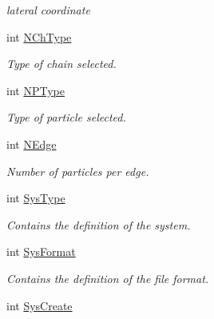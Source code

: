 \begin{DoxyCompactItemize}
\begin{DoxyCompactList}\small\item\em lateral coordinate \end{DoxyCompactList}\item 
\hypertarget{classVarData_ab414e7210af332040754fc1daaa67509}{int \hyperlink{classVarData_ab414e7210af332040754fc1daaa67509}{\-N\-Ch\-Type}}\label{classVarData_ab414e7210af332040754fc1daaa67509}

\begin{DoxyCompactList}\small\item\em \-Type of chain selected. \end{DoxyCompactList}\item 
\hypertarget{classVarData_a4a5c47b800a1299ec5e54e369467dfeb}{int \hyperlink{classVarData_a4a5c47b800a1299ec5e54e369467dfeb}{\-N\-P\-Type}}\label{classVarData_a4a5c47b800a1299ec5e54e369467dfeb}

\begin{DoxyCompactList}\small\item\em \-Type of particle selected. \end{DoxyCompactList}\item 
\hypertarget{classVarData_ae2e67b49132b33a026b19c647cbf4f3c}{int \hyperlink{classVarData_ae2e67b49132b33a026b19c647cbf4f3c}{\-N\-Edge}}\label{classVarData_ae2e67b49132b33a026b19c647cbf4f3c}

\begin{DoxyCompactList}\small\item\em \-Number of particles per edge. \end{DoxyCompactList}\item 
\hypertarget{classVarData_ad396ed53d4010dad8257a97973324c40}{int \hyperlink{classVarData_ad396ed53d4010dad8257a97973324c40}{\-Sys\-Type}}\label{classVarData_ad396ed53d4010dad8257a97973324c40}

\begin{DoxyCompactList}\small\item\em \-Contains the definition of the system. \end{DoxyCompactList}\item 
\hypertarget{classVarData_acefa5842862d4587442db05af40e7490}{int \hyperlink{classVarData_acefa5842862d4587442db05af40e7490}{\-Sys\-Format}}\label{classVarData_acefa5842862d4587442db05af40e7490}

\begin{DoxyCompactList}\small\item\em \-Contains the definition of the file format. \end{DoxyCompactList}\item 
\hypertarget{classVarData_a65bbdadfbbcdbe903f9777e66b02920c}{int \hyperlink{classVarData_a65bbdadfbbcdbe903f9777e66b02920c}{\-Sys\-Create}}\label{classVarData_a65bbdadfbbcdbe903f9777e66b02920c}


\end{DoxyCompactItemize}
